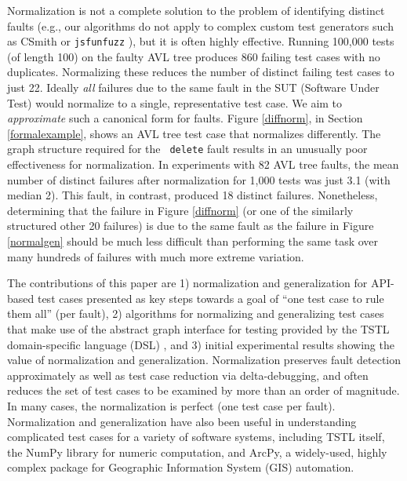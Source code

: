 Normalization is not a complete solution to the problem of identifying
distinct faults (e.g., our algorithms do not apply to complex custom
test generators such as CSmith \cite{csmith} or {\tt jsfunfuzz}
\cite{jsfunfuzz}), but it is often highly effective.  Running 100,000
tests (of length 100) on the faulty AVL tree produces 860 failing test
cases with no duplicates.  Normalizing these reduces the number of
distinct failing test cases to just 22.  Ideally \emph{all} failures
due to the same fault in the SUT (Software Under Test) would normalize
to a single, representative test case.  We aim to
\emph{approximate} such a canonical form for faults.  Figure \ref{diffnorm},
in Section \ref{formalexample}, shows an AVL tree test case that
normalizes differently.  The graph structure required for the {\tt
  delete} fault results in an
unusually poor effectiveness for normalization.  In experiments with 82 AVL tree faults,
the mean number of distinct failures after normalization for 1,000
tests was just 3.1 (with median 2). This fault, in contrast, produced 18
distinct failures.  Nonetheless, determining that the failure in Figure
\ref{diffnorm} (or one of the similarly structured other 20 failures)
is due to the same fault as the failure in Figure \ref{normalgen}
should be much less difficult than performing the same task over many hundreds of failures with much more extreme variation. 

The contributions of this paper are 1) normalization and
generalization for API-based test cases presented as key steps towards a goal of
``one test case to rule them all'' (per fault), 2) algorithms for
normalizing and generalizing test cases that make use of the abstract
graph interface for testing provided by the TSTL
\cite{tstl,NFM15,ISSTA15} domain-specific language (DSL) \cite{Fow10}, and 3) initial
experimental results showing the value of normalization and
generalization.  Normalization preserves fault
detection approximately as well as test case reduction via
delta-debugging, and often reduces the set of test cases to be
examined by more than an order of magnitude. In many cases, the
normalization is perfect (one test case per fault).  Normalization and generalization have also been useful in
understanding complicated test cases for a variety of software systems, including
TSTL itself, the NumPy library for numeric computation, and
ArcPy, a widely-used, highly complex package for Geographic
Information System (GIS) automation.

